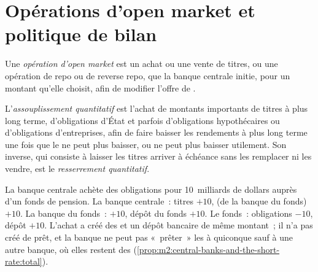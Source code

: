 \section{Opérations d'open market et politique de bilan}

\begin{definition}\label{def:m2:central-banks-and-the-short-rate:omo}
Une \emph{opération d'open market} est un achat ou
une vente de titres, ou une opération de repo ou de reverse repo, que la banque centrale
initie, pour un montant qu'elle choisit, afin de modifier l'offre de .
\end{definition}

\begin{definition}\label{def:m2:central-banks-and-the-short-rate:qe}
L'\emph{assouplissement quantitatif} est l'achat de
montants importants de titres à plus long terme, d'obligations d'État et parfois
d'obligations hypothécaires ou d'obligations d'entreprises, afin de faire baisser les rendements à plus long terme une fois que le 
ne peut plus baisser, ou ne peut plus baisser utilement. Son inverse, qui consiste à laisser les titres
arriver à échéance sans les remplacer ni les vendre, est le \emph{resserrement
quantitatif}.
\end{definition}

\begin{example}\label{ex:m2:central-banks-and-the-short-rate:purchase}
La banque centrale achète des obligations pour 10~milliards de dollars auprès d'un fonds de pension. La
banque centrale~: titres $+10$,  (de la banque du fonds) $+10$. La
banque du fonds~:  $+10$, dépôt du fonds $+10$. Le fonds~: obligations
$-10$, dépôt $+10$. L'achat a créé des  et un dépôt bancaire de
même montant~; il n'a pas créé de prêt, et la banque ne peut pas «~prêter~» les
 à quiconque sauf à une autre banque, où elles restent des 
(\cref{prop:m2:central-banks-and-the-short-rate:total}).
\end{example}

